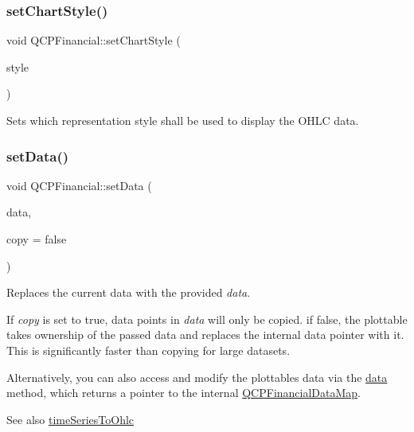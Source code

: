 \subsubsection{\texorpdfstring{set\+Chart\+Style()}{setChartStyle()}}
{\footnotesize\ttfamily void Q\+C\+P\+Financial\+::set\+Chart\+Style (\begin{DoxyParamCaption}\item[{\mbox{\hyperlink{class_q_c_p_financial_a0f800e21ee98d646dfc6f8f89d10ebfb}{Q\+C\+P\+Financial\+::\+Chart\+Style}}}]{style }\end{DoxyParamCaption})}

Sets which representation style shall be used to display the O\+H\+LC data. \mbox{\label{class_q_c_p_financial_adf12a86082f1e488df6a4e8603f8fd6d}} 
\subsubsection{\texorpdfstring{set\+Data()}{setData()}\hspace{0.1cm}{\footnotesize\ttfamily [1/2]}}
{\footnotesize\ttfamily void Q\+C\+P\+Financial\+::set\+Data (\begin{DoxyParamCaption}\item[{\mbox{\hyperlink{qcustomplot_8h_a745c09823fae0974b50beca9bc3b3d7d}{Q\+C\+P\+Financial\+Data\+Map}} $\ast$}]{data,  }\item[{bool}]{copy = {\ttfamily false} }\end{DoxyParamCaption})}

Replaces the current data with the provided {\itshape data}.

If {\itshape copy} is set to true, data points in {\itshape data} will only be copied. if false, the plottable takes ownership of the passed data and replaces the internal data pointer with it. This is significantly faster than copying for large datasets.

Alternatively, you can also access and modify the plottable\textquotesingle{}s data via the \mbox{\hyperlink{class_q_c_p_financial_a528c81578e4f25999a9169127763cfd4}{data}} method, which returns a pointer to the internal \mbox{\hyperlink{qcustomplot_8h_a745c09823fae0974b50beca9bc3b3d7d}{Q\+C\+P\+Financial\+Data\+Map}}.

\begin{DoxySeeAlso}{See also}
\mbox{\hyperlink{class_q_c_p_financial_a0c3453d1c03e320950fdd2df54e3ebc8}{time\+Series\+To\+Ohlc}} 
\end{DoxySeeAlso}
\mbox{\label{class_q_c_p_financial_a886881339d6447432af55adaad748c3c}} 
